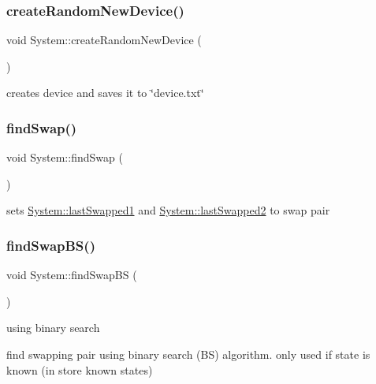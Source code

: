 \subsubsection{\texorpdfstring{create\+Random\+New\+Device()}{createRandomNewDevice()}}
{\footnotesize\ttfamily void System\+::create\+Random\+New\+Device (\begin{DoxyParamCaption}{ }\end{DoxyParamCaption})}

creates device and saves it to \char`\"{}device.\+txt\char`\"{} \mbox{\label{classSystem_a2570343111c1794aca7e6005b4726b92}} 
\subsubsection{\texorpdfstring{find\+Swap()}{findSwap()}}
{\footnotesize\ttfamily void System\+::find\+Swap (\begin{DoxyParamCaption}{ }\end{DoxyParamCaption})\hspace{0.3cm}{\ttfamily [private]}}

sets \hyperlink{classSystem_a6cae5a9a0157f7e6042bda0807879568}{System\+::last\+Swapped1} and \hyperlink{classSystem_a6ddf57bedba9389eb75ffb60cad1391c}{System\+::last\+Swapped2} to swap pair \mbox{\label{classSystem_afbafce4188cca27e7e37892049b45856}} 
\subsubsection{\texorpdfstring{find\+Swap\+B\+S()}{findSwapBS()}}
{\footnotesize\ttfamily void System\+::find\+Swap\+BS (\begin{DoxyParamCaption}{ }\end{DoxyParamCaption})\hspace{0.3cm}{\ttfamily [private]}}

using binary search

find swapping pair using binary search (BS) algorithm. only used if state is known (in store known states) \mbox{\label{classSystem_a8b1198a23ff52e2460fd605f727419c2}} 

